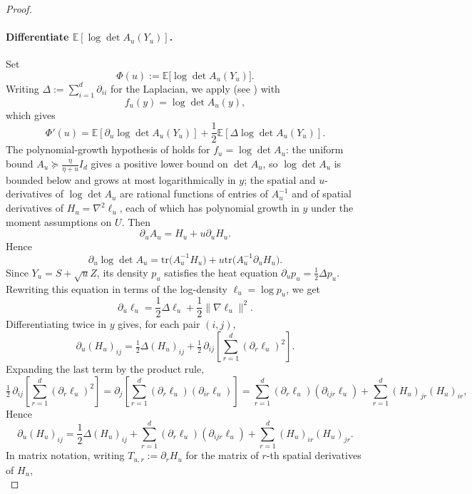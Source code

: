 \documentclass[11pt]{article}
\def\E{\mathbb{E}}
\newcommand{\norm}[1]{\|#1\|}
\newcommand{\tr}{\mathrm{tr}}
\begin{document}
\begin{proof}
\paragraph{Differentiate \(\E[\log\det A_u(Y_u)]\).}
Set
\[
\Phi(u):=\E\big[\log\det A_u(Y_u)\big].
\]
Writing \(\Delta:=\sum_{i=1}^d\partial_{ii}\) for the Laplacian, we apply  (see ) with
\[
f_u(y)=\log\det A_u(y),
\]
which gives
\begin{equation}
\label{eq:Phi_prime_from_heat_lemma}
\Phi'(u)
=
\E[\partial_u\log\det A_u(Y_u)] + \frac12\E[\Delta\log\det A_u(Y_u)].
\end{equation}
The polynomial-growth hypothesis of  holds for \(f_u=\log\det A_u\): the uniform bound \(A_u\succeq\frac{\eta}{\eta+u}I_d\) gives a positive lower bound on \(\det A_u\), so \(\log\det A_u\) is bounded below and grows at most logarithmically in \(y\); the spatial and \(u\)-derivatives of \(\log\det A_u\) are rational functions of entries of \(A_u^{-1}\) and of spatial derivatives of \(H_u=\nabla^2\ell_u\), each of which has polynomial growth in \(y\) under the moment assumptions on \(U\).
Then
\[
\partial_u A_u = H_u + u\partial_u H_u.
\]
Hence
\begin{equation}
\label{eq:du_logdetA}
\partial_u\log\det A_u = \tr\big(A_u^{-1}H_u\big) + u\tr\big(A_u^{-1}\partial_u H_u\big).
\end{equation}
Since $Y_u = S + \sqrt{u}Z$, its density $p_u$ satisfies the heat equation \(\partial_u p_u=\tfrac12\Delta p_u\).  Rewriting this equation in terms of the log-density \(\ell_u=\log p_u\), we get
\[
\partial_u \ell_u = \frac12\Delta\ell_u + \frac12\norm{\nabla\ell_u}^2.
\]
Differentiating twice in \(y\) gives, for each pair \((i,j)\),
\[
\partial_u(H_u)_{ij}
=
\tfrac12\Delta(H_u)_{ij}
+
\tfrac12\,\partial_{ij}\!\left[\sum_{r=1}^d (\partial_r\ell_u)^2\right].
\]
Expanding the last term by the product rule,
\[
\tfrac12\,\partial_{ij}\!\left[\sum_{r=1}^d (\partial_r\ell_u)^2\right]
=
\partial_j\!\left[\sum_{r=1}^d (\partial_r\ell_u)(\partial_{ir}\ell_u)\right]
=
\sum_{r=1}^d (\partial_r\ell_u)(\partial_{ijr}\ell_u)
+
\sum_{r=1}^d (H_u)_{jr}(H_u)_{ir},
\]
Hence
\[
\partial_u (H_u)_{ij}
=
\frac12\Delta (H_u)_{ij}
+
\sum_{r=1}^d (\partial_r\ell_u)(\partial_{ijr}\ell_u)
+
\sum_{r=1}^d (H_u)_{ir}(H_u)_{jr}.
\]
In matrix notation, writing \(T_{u,r}:=\partial_r H_u\) for the matrix of \(r\)-th spatial derivatives of \(H_u\),
\begin{equation}
\label{eq:Hu_evolution_matrix}

\end{equation}
\end{proof}
\end{document}
